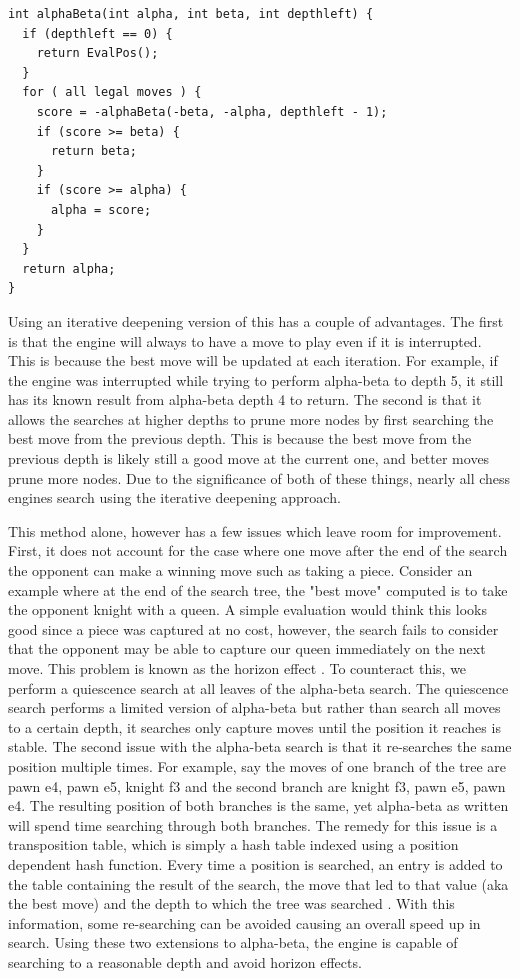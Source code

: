 \documentclass[11pt]{article}
\begin{document}
\begin{lstlisting}
int alphaBeta(int alpha, int beta, int depthleft) {
  if (depthleft == 0) {
    return EvalPos();
  }
  for ( all legal moves ) {
    score = -alphaBeta(-beta, -alpha, depthleft - 1);
    if (score >= beta) {
      return beta;
    }
    if (score >= alpha) {
      alpha = score;
    }
  }
  return alpha;
}
\end{lstlisting}

Using an iterative deepening version of this has a couple of advantages. The first is that the engine will always to have a move to play even if it is interrupted. This is because the best move will be updated at each iteration. For example, if the engine was interrupted while trying to perform alpha-beta to depth 5, it still has its known result from alpha-beta depth 4 to return. The second is that it allows the searches at higher depths to prune more nodes by first searching the best move from the previous depth. This is because the best move from the previous depth is likely still a good move at the current one, and better moves prune more nodes. Due to the significance of both of these things, nearly all chess engines search using the iterative deepening approach.

This method alone, however has a few issues which leave room for improvement. First, it does not account for the case where one move after the end of the search the opponent can make a winning move such as taking a piece. Consider an example where at the end of the search tree, the "best move" computed is to take the opponent knight with a queen. A simple evaluation would think this looks good since a piece was captured at no cost, however, the search fails to consider that the opponent may be able to capture our queen immediately on the next move. This problem is known as the horizon effect \cite{tabibi2002verified}. To counteract this, we perform a quiescence search at all leaves of the alpha-beta search. The quiescence search performs a  limited version of alpha-beta but rather than search all moves to a certain depth, it searches only capture moves until the position it reaches is stable. The second issue with the alpha-beta search is that it re-searches the same position multiple times. For example, say the moves of one branch of the tree are pawn e4, pawn e5, knight f3 and the second branch are knight f3, pawn e5, pawn e4. The resulting position of both branches is the same, yet alpha-beta as written will spend time searching through both branches. The remedy for this issue is a transposition table, which is simply a hash table indexed using a position dependent hash function. Every time a position is searched, an entry is added to the table containing the result of the search, the move that led to that value (aka the best move) and the depth to which the tree was searched \cite{schaeffer1989history}. With this information, some re-searching can be avoided causing an overall speed up in search. Using these two extensions to alpha-beta, the engine is capable of searching to a reasonable depth and avoid horizon effects.
\end{document}
